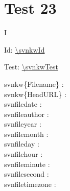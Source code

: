 \documentclass[12pt]{report}
\begin{document}
\raggedright

\chapter{Test 23}

\noindent
{} I 

Id: \url{\svnkwId}
\svnkwId

Test: \url{\svnkwTest}
\svnkwTest

 \noindent
 svnkw\{Filename\} :  \\
 svnkw\{HeadURL\}  :  \\
 svnfiledate : \svnfiledate  \\
 svnfileauthor : \svnfileauthor  \\
 svnfileyear : \svnfileyear  \\
 svnfilemonth : \svnfilemonth  \\
 svnfileday : \svnfileday  \\
 svnfilehour : \svnfilehour  \\
 svnfileminute : \svnfileminute  \\
 svnfilesecond : \svnfilesecond  \\
 svnfiletimezone : \svnfiletimezone  \\
\end{document}
